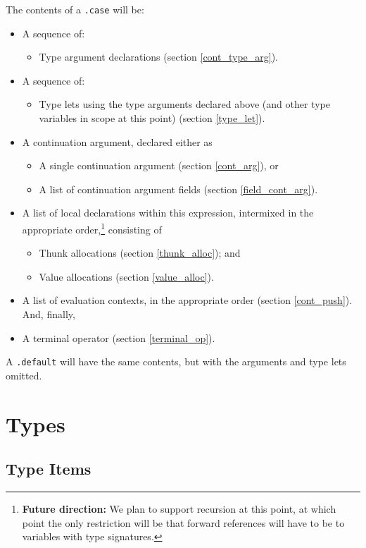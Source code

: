 \documentclass{report}
\newcommand\stringcode[1]{\texttt{#1}}
\newcommand\future[1]{\footnote{\textbf{Future direction:} #1}}
\begin{document}
The contents of a \stringcode{.case} will be:
\begin{itemize}
    \item A sequence of:
        \begin{itemize}
            \item Type argument declarations (section \ref{cont_type_arg}).
        \end{itemize}
    \item A sequence of:
        \begin{itemize}
            \item Type lets using the type arguments declared above (and other type variables in scope at this point) (section \ref{type_let}).
        \end{itemize}
    \item A continuation argument, declared either as
        \begin{itemize}
            \item A single continuation argument (section \ref{cont_arg}), or
            \item A list of continuation argument fields (section \ref{field_cont_arg}).
        \end{itemize}
    \item A list of local declarations within this expression,
        intermixed in the appropriate order,\future{We plan to support recursion at this point, at which point the only restriction will be that forward references will have to be to variables with type signatures.}
        consisting of
        \begin{itemize}
            \item Thunk allocations (section \ref{thunk_alloc}); and
            \item Value allocations (section \ref{value_alloc}).
        \end{itemize}
    \item A list of evaluation contexts, in the appropriate order (section \ref{cont_push}).
        And, finally,
    \item A terminal operator (section \ref{terminal_op}).
\end{itemize}
A \stringcode{.default} will have the same contents, but with the arguments and type lets omitted.

\chapter{Types}

\section{Type Items}
\end{document}
